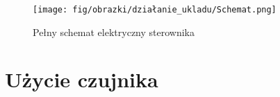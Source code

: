 \documentclass[11pt, a4paper]{article}
\begin{document}



\begin{figure}[h!]
    \centering
    \texttt{[image: fig/obrazki/działanie\_ukladu/Schemat.png]}
    \caption{Pełny schemat elektryczny sterownika}
    \label{fig:my_label}
\end{figure}





\newpage






\newpage

\section{Użycie czujnika}
\end{document}
